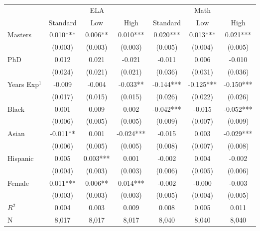 \renewcommand{\arraystretch}{1.2}

\begin{tabular}{lcccccc}
    \toprule
    \midrule
     & \multicolumn{3}{c}{ELA} & \multicolumn{3}{c}{Math} \\
     & Standard & Low & High & Standard & Low & High \\
    \midrule
    Masters & 0.010*** & 0.006** & 0.010*** & 0.020*** & 0.013*** & 0.021*** \\
     & (0.003) & (0.003) & (0.003) & (0.005) & (0.004) & (0.005) \\
    PhD & 0.012 & 0.021 & -0.021 & -0.011 & 0.006 & -0.010 \\
     & (0.024) & (0.021) & (0.021) & (0.036) & (0.031) & (0.036) \\
    Years Exp$^1$ & -0.009 & -0.004 & -0.033** & -0.144*** & -0.125*** & -0.150*** \\
     & (0.017) & (0.015) & (0.015) & (0.026) & (0.022) & (0.026) \\
    Black & 0.001 & 0.009 & 0.002 & -0.042*** & -0.015 & -0.052*** \\
     & (0.006) & (0.005) & (0.005) & (0.009) & (0.007) & (0.009) \\
    Asian & -0.011** & 0.001 & -0.024*** & -0.015 & 0.003 & -0.029*** \\
     & (0.006) & (0.005) & (0.005) & (0.008) & (0.007) & (0.008) \\
    Hispanic & 0.005 & 0.003*** & 0.001 & -0.002 & 0.004 & -0.002 \\
     & (0.004) & (0.003) & (0.003) & (0.006) & (0.005) & (0.006) \\
    Female & 0.011*** & 0.006** & 0.014*** & -0.002 & -0.000 & -0.003 \\
     & (0.003) & (0.003) & (0.003) & (0.005) & (0.004) & (0.005) \\
    \midrule
    $R^2$ & 0.004 & 0.003 & 0.009 & 0.008 & 0.005 & 0.011 \\
    N & 8,017 & 8,017 & 8,017 & 8,040 & 8,040 & 8,040 \\
    \midrule
    \bottomrule
\end{tabular}

